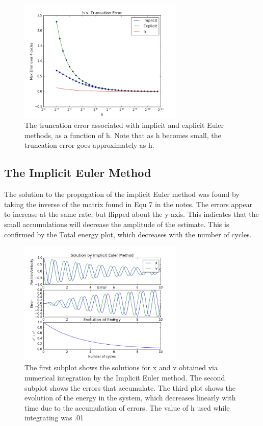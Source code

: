 \documentclass[a4paper]{article}
\begin{document}
\begin{figure}[H]
\centering
\includegraphics[width=0.7\textwidth]{t_err.png}
\caption{\label{fig:t_err}The truncation error associated with implicit and explicit Euler methods, as a function of h. Note that as h becomes small, the truncation error goes approximately as h.}
\end{figure}

\subsection{The Implicit Euler Method}
The solution to the propagation of the implicit Euler method was found by taking the inverse of the matrix found in Equ 7 in the notes. The errors appear to increase at the same rate, but flipped about the y-axis. This indicates that the small accumulations will decrease the amplitude of the estimate. This is confirmed by the Total energy plot, which decreases with the number of cycles.

\begin{figure}[H]
\centering
\includegraphics[width=0.7\textwidth]{impl.png}
\caption{\label{fig:expl}The first subplot shows the solutions for x and v obtained via numerical integration by the Implicit Euler method. The second subplot shows the errors that accumulate. The third plot shows the evolution of the energy in the system, which decreases linearly with time due to the accumulation of errors. The value of h used while integrating was .01}
\end{figure}
\end{document}
